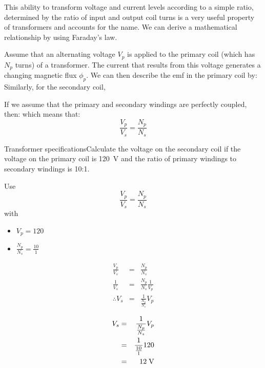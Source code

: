 This ability to transform
voltage and current levels according to a simple ratio, determined
by the ratio of input and output coil turns is a very useful property of transformers and accounts for the name. We can derive a
mathematical relationship by using Faraday's law.

Assume that an alternating voltage ${V_p}$ is applied to the
primary coil (which has $N_p$ turns) of a transformer. The current
that results from this voltage generates a changing magnetic flux $\phi_p$.
We can then describe the emf in the primary coil by:  Similarly, for the secondary
coil, 

If we assume that the primary and secondary windings are perfectly
coupled, then:  which means that:
\begin {equation*}
\frac{V_p}{V_s}=\frac{N_p}{N_s}
\end {equation*}

\begin{wex}{Transformer specifications}{Calculate the voltage on the secondary coil if the voltage on the primary coil is 120~V and the ratio of primary windings to secondary windings is 10:1.}{

 Use
\begin {equation*}
\frac{V_p}{V_s}=\frac{N_p}{N_s}
\end {equation*}
with
\begin{itemize}
\item $V_p=120$
\item $\frac{N_p}{N_s}=\frac{10}{1}$
\end{itemize}

\begin{eqnarray*}
\frac{V_p}{V_s}&=&\frac{N_p}{N_s}\\
\frac{1}{V_s}&=&\frac{N_p}{N_s}\frac{1}{V_p}\\
\therefore V_s&=&\frac{1}{\frac{N_p}{N_s}}V_p
\end{eqnarray*}

\begin{eqnarray*}
V_s&=&\frac{1}{\frac{N_p}{N_s}}V_p\\
&=&\frac{1}{\frac{10}{1}}120\\
&=&12\;\rm{V}
\end{eqnarray*}

}
\end{wex}


